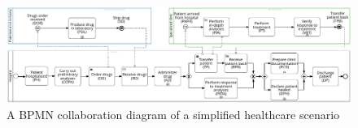 \def\Talice{\Activ{PH, COPA, OD, \color{pharmacolor}DOR, PDL, SD, \color{black}RD, AD, TP, \color{specializedcliniccolor}PAFH, PIA, PT, VRT, TPB, \color{black}RPB, DPH, PCD, DP}}
\def\Tbob{\Activ{PH, COPA, OD, \color{pharmacolor}DOR, PDL, SD, \color{black}RD, AD, PRTA, PCD, DPH, DP}}
\def\TaliceUncolored{\Activ{PH, COPA, OD, DOR, PDL, SD, RD, AD, TP, PAFH, PIA, PT, VRT, TPB, RPB, DPH, PCD, DP}}
\def\TbobUncolored{\Activ{PH, COPA, OD, DOR, PDL, SD, RD, AD, TP, DPH, PCD, DP}}
\begin{figure}[t]
\centering
\includegraphics[width=\linewidth]{content/figures/bpmnHealthcare2.pdf}
\caption{A BPMN collaboration diagram of a simplified healthcare scenario}
\label{fig:BPMN_Healthcare}
\end{figure}
